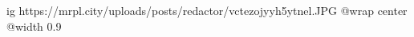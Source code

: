  
 
 
 
 

\ifcmt
  ig https://mrpl.city/uploads/posts/redactor/vctezojyyh5ytnel.JPG
  @wrap center
  @width 0.9
\fi
